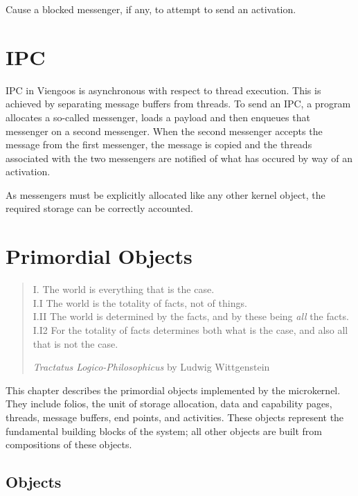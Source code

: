 Cause a blocked messenger, if any, to attempt to send an activation.

\chapter{IPC}

IPC in Viengoos is asynchronous with respect to thread execution.
This is achieved by separating message buffers from threads.  To send
an IPC, a program allocates a so-called messenger, loads a payload and
then enqueues that messenger on a second messenger.  When the second
messenger accepts the message from the first messenger, the message is
copied and the threads associated with the two messengers are notified
of what has occured by way of an activation.

As messengers must be explicitly allocated like any other kernel
object, the required storage can be correctly accounted.


\chapter{Primordial Objects}

\begin{quotation}
\noindent
I. The world is everything that is the case.\\
I.I The world is the totality of facts, not of things.\\
I.II The world is determined by the facts, and by these being
\emph{all} the facts.\\
I.I2 For the totality of facts determines both what is the case, and
also all that is not the case.

\begin{flushright}
\emph{Tractatus Logico-Philosophicus} by Ludwig Wittgenstein
\end{flushright}
\end{quotation}

This chapter describes the primordial objects implemented by the
microkernel.  They include folios, the unit of storage allocation,
data and capability pages, threads, message buffers, end points, and
activities.  These objects represent the fundamental building blocks
of the system; all other objects are built from compositions of these
objects.

\clearpage
\section{Objects}


